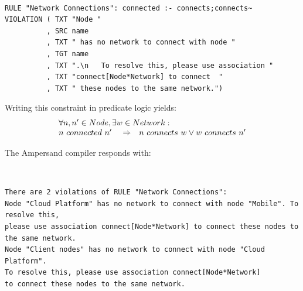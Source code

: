 \documentclass[sn-vancouver]{sn-jnl}%
\theoremstyle{thmstyleone}%
\theoremstyle{thmstyletwo}%
\theoremstyle{thmstylethree}%
\begin{document}
{\tt\small
\begin{lstlisting}[frame=single, label={mc5}, caption={}]
RULE "Network Connections": connected :- connects;connects~
VIOLATION ( TXT "Node "
          , SRC name
          , TXT " has no network to connect with node "
          , TGT name
          , TXT ".\n   To resolve this, please use association "
          , TXT "connect[Node*Network] to connect  "
          , TXT " these nodes to the same network.")
\end{lstlisting}
}

Writing this constraint in predicate logic yields:
\[\begin{array}{rcl}
   \multicolumn{3}{l}{\forall n,n' \in Node, \exists w\in Network:}\\
   n\ connected\ n'\ &\Rightarrow&n\ connects\ w\vee w\ connects\ n'
\end{array}\]

The Ampersand compiler responds with:

{\tt\small
\begin{lstlisting}[frame=single, label={mc5result}, caption={}]
There are 2 violations of RULE "Network Connections":
Node "Cloud Platform" has no network to connect with node "Mobile". To resolve this,
please use association connect[Node*Network] to connect these nodes to the same network.
Node "Client nodes" has no network to connect with node "Cloud Platform".
To resolve this, please use association connect[Node*Network]
to connect these nodes to the same network.   
\end{lstlisting}
}
\end{document}
